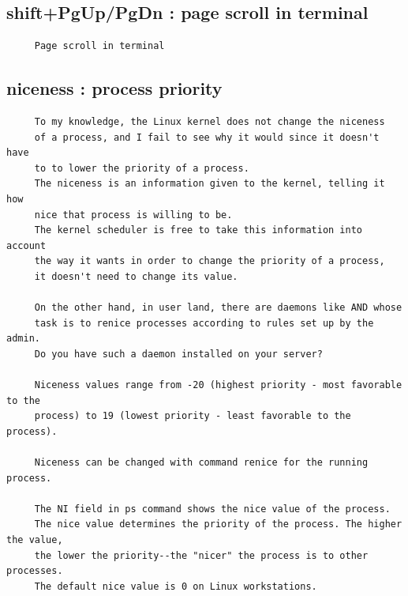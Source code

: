 \documentclass[a4paper,12pt]{article}
\begin{document}
\subsection{shift+PgUp/PgDn     : page scroll in terminal}
\begin{verbatim}
     Page scroll in terminal
\end{verbatim}

\subsection{niceness  : process priority}
\begin{verbatim}
     To my knowledge, the Linux kernel does not change the niceness
     of a process, and I fail to see why it would since it doesn't have
     to to lower the priority of a process. 
     The niceness is an information given to the kernel, telling it how
     nice that process is willing to be. 
     The kernel scheduler is free to take this information into account
     the way it wants in order to change the priority of a process,
     it doesn't need to change its value.

     On the other hand, in user land, there are daemons like AND whose
     task is to renice processes according to rules set up by the admin.
     Do you have such a daemon installed on your server?

     Niceness values range from -20 (highest priority - most favorable to the    
     process) to 19 (lowest priority - least favorable to the process).

     Niceness can be changed with command renice for the running process. 

     The NI field in ps command shows the nice value of the process.
     The nice value determines the priority of the process. The higher the value, 
     the lower the priority--the "nicer" the process is to other processes. 
     The default nice value is 0 on Linux workstations. 
 
\end{verbatim}
\end{document}

